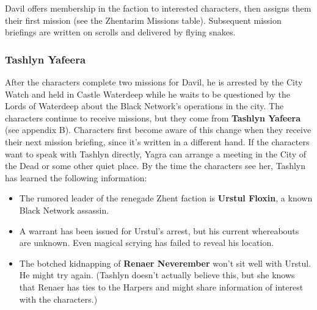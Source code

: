 \documentclass[10pt,a4paper,twoside,twocolumn,openany,nodeprecatedcode]{dndbook}
\begin{document}
Davil offers membership in the faction to interested characters, then assigns them their first mission (see the Zhentarim Missions table). Subsequent mission briefings are written on scrolls and delivered by flying snakes.
\subsubsection{Tashlyn Yafeera}
After the characters complete two missions for Davil, he is arrested by the City Watch and held in Castle Waterdeep while he waits to be questioned by the Lords of Waterdeep about the Black Network's operations in the city. The characters continue to receive missions, but they come from \textbf{Tashlyn Yafeera} (see appendix B). Characters first become aware of this change when they receive their next mission briefing, since it's written in a different hand.
If the characters want to speak with Tashlyn directly, Yagra can arrange a meeting in the City of the Dead or some other quiet place. By the time the characters see her, Tashlyn has learned the following information:
\begin{itemize}

\item The rumored leader of the renegade Zhent faction is \textbf{Urstul Floxin}, a known Black Network assassin.
\item A warrant has been issued for Urstul's arrest, but his current whereabouts are unknown. Even magical scrying has failed to reveal his location.
\item The botched kidnapping of \textbf{Renaer Neverember} won't sit well with Urstul. He might try again. (Tashlyn doesn't actually believe this, but she knows that Renaer has ties to the Harpers and might share information of interest with the characters.)
\end{itemize}
\end{document}
